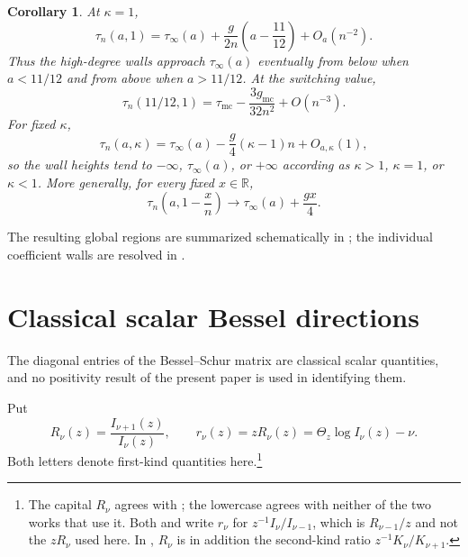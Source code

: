 \documentclass[11pt,a4paper]{amsart}
\numberwithin{equation}{section}
\theoremstyle{plain}
\newtheorem{corollary}[theorem]{Corollary}
\theoremstyle{definition}
\newcommand{\R}{\mathbb R}
\newcommand{\Thetaz}{\Theta_z}
\begin{document}
\begin{corollary}\label{cor:wall-orientation}
At \(\kappa=1\),
\begin{equation}\label{eq:wall-orientation}
 \tau_n(a,1)
 =\tau_\infty(a)+\frac{g}{2n}\left(a-\frac{11}{12}\right)+O_a(n^{-2}).
\end{equation}
Thus the high-degree walls approach \(\tau_\infty(a)\) eventually from below
when \(a<11/12\) and from above when \(a>11/12\).  At the switching value,
\begin{equation}\label{eq:critical-wall-orientation}
 \tau_n(11/12,1)
 =\tau_{\mathrm{mc}}-\frac{3g_{\mathrm{mc}}}{32n^2}+O(n^{-3}).
\end{equation}
For fixed \(\kappa\),
\begin{equation}\label{eq:wall-transverse}
 \tau_n(a,\kappa)
 =\tau_\infty(a)-\frac g4(\kappa-1)n+O_{a,\kappa}(1),
\end{equation}
so the wall heights tend to \(-\infty\), \(\tau_\infty(a)\), or \(+\infty\)
according as \(\kappa>1\), \(\kappa=1\), or \(\kappa<1\).  More generally,
for every fixed \(x\in\R\),
\begin{equation}\label{eq:wall-tangent-cone}
 \tau_n\!\left(a,1-\frac{x}{n}\right)
 \longrightarrow \tau_\infty(a)+\frac{gx}{4}.
\end{equation}
\end{corollary}

The resulting global regions are summarized schematically in
; the individual coefficient walls are resolved in
.

\section{Classical scalar Bessel directions}\label{sec:scalar}

The diagonal entries of the Bessel--Schur matrix are classical scalar
quantities, and no positivity result of the present paper is used in
identifying them.

Put
\begin{equation}\label{eq:R-r-def}
 R_\nu(z)=\frac{I_{\nu+1}(z)}{I_\nu(z)},
 \qquad
 r_\nu(z)=zR_\nu(z)=\Thetaz\log I_\nu(z)-\nu.
\end{equation}
Both letters denote first-kind quantities here.\footnote{The capital
\(R_\nu\) agrees with \cite{HornikGrun2013Amos}; the lowercase agrees with
neither of the two works that use it.  Both \cite{Segura2011BoundsRatios} and
\cite{HornikGrun2013Amos} write \(r_\nu\) for \(z^{-1}I_\nu/I_{\nu-1}\), which
is \(R_{\nu-1}/z\) and not the \(zR_\nu\) used here.  In
\cite{Segura2011BoundsRatios}, \(R_\nu\) is in addition the second-kind ratio
\(z^{-1}K_\nu/K_{\nu+1}\).}
\end{document}
